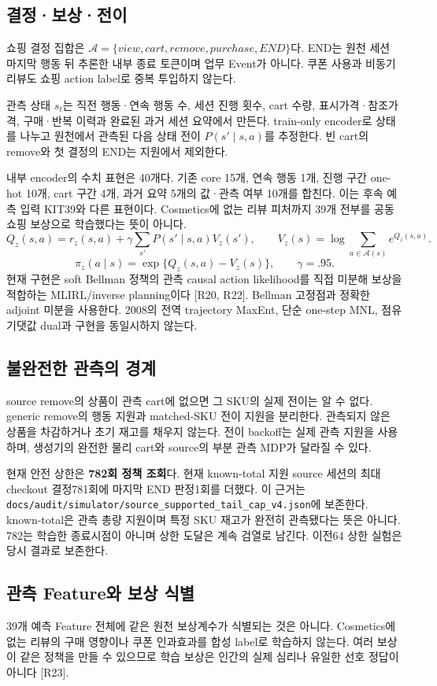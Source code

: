 \documentclass[11pt,a4paper]{article}
\newcommand{\code}[1]{{\ttfamily\footnotesize\nolinkurl{#1}}}
\begin{document}
\subsection{결정·보상·전이}
쇼핑 결정 집합은 $\mathcal A=\{view,cart,remove,purchase,END\}$다. END는 원천 세션 마지막 행동 뒤 추론한 내부 종료 토큰이며 업무 Event가 아니다. 쿠폰 사용과 비동기 리뷰도 쇼핑 action label로 중복 투입하지 않는다.

관측 상태 $s_t$는 직전 행동·연속 행동 수, 세션 진행 횟수, cart 수량, 표시가격·참조가격, 구매·반복 이력과 완료된 과거 세션 요약에서 만든다. train-only encoder로 상태를 나누고 원천에서 관측된 다음 상태 전이 $P(s'\mid s,a)$를 추정한다. 빈 cart의 remove와 첫 결정의 END는 지원에서 제외한다.

내부 encoder의 수치 표현은 40개다. 기존 core 15개, 연속 행동 1개, 진행 구간 one-hot 10개, cart 구간 4개, 과거 요약 5개의 값·관측 여부 10개를 합친다. 이는 후속 예측 입력 KIT39와 다른 표현이다. Cosmetics에 없는 리뷰 피처까지 39개 전부를 공동 쇼핑 보상으로 학습했다는 뜻이 아니다.
\[
Q_z(s,a)=r_z(s,a)+\gamma\sum_{s'}P(s'\mid s,a)V_z(s'),\qquad
V_z(s)=\log\sum_{a\in\mathcal A(s)}e^{Q_z(s,a)}.
\]
\[
\pi_z(a\mid s)=\exp\{Q_z(s,a)-V_z(s)\},\qquad \gamma=.95.
\]
현재 구현은 soft Bellman 정책의 관측 causal action likelihood를 직접 미분해 보상을 적합하는 MLIRL/inverse planning이다 [R20, R22]. Bellman 고정점과 정확한 adjoint 미분을 사용한다. 2008의 전역 trajectory MaxEnt, 단순 one-step MNL, 점유기댓값 dual과 구현을 동일시하지 않는다.

\subsection{불완전한 관측의 경계}
source remove의 상품이 관측 cart에 없으면 그 SKU의 실제 전이는 알 수 없다. generic remove의 행동 지원과 matched-SKU 전이 지원을 분리한다. 관측되지 않은 상품을 차감하거나 초기 재고를 채우지 않는다. 전이 backoff는 실제 관측 지원을 사용하며, 생성기의 완전한 물리 cart와 source의 부분 관측 MDP가 달라질 수 있다.

현재 안전 상한은 \textbf{782회 정책 조회}다. 현재 known-total 지원 source 세션의 최대 checkout 결정781회에 마지막 END 판정1회를 더했다. 이 근거는 \code{docs/audit/simulator/source_supported_tail_cap_v4.json}에 보존한다. known-total은 관측 총량 지원이며 특정 SKU 재고가 완전히 관측됐다는 뜻은 아니다. 782는 학습한 종료시점이 아니며 상한 도달은 계속 검열로 남긴다. 이전64 상한 실험은 당시 결과로 보존한다.

\subsection{관측 Feature와 보상 식별}
39개 예측 Feature 전체에 같은 원천 보상계수가 식별되는 것은 아니다. Cosmetics에 없는 리뷰의 구매 영향이나 쿠폰 인과효과를 합성 label로 학습하지 않는다. 여러 보상이 같은 정책을 만들 수 있으므로 학습 보상은 인간의 실제 심리나 유일한 선호 정답이 아니다 [R23].
\end{document}
